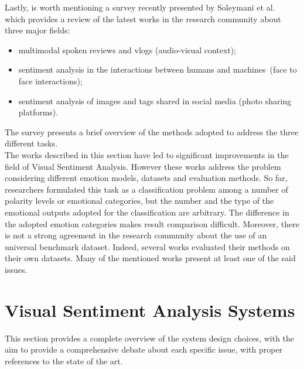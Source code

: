 Lastly, is worth mentioning a survey recently presented by Soleymani et al.~\cite{soleymani2017survey} which provides a review of the latest works in the research community about three major fields:
\begin{itemize}
	\item multimodal spoken reviews and vlogs (audio-visual context);
	\item sentiment analysis in the interactions between humans and machines~(face to face interactions);
	\item sentiment analysis of images and tags shared in social media (photo sharing platforms).
\end{itemize}
The survey presents a brief overview of the methods adopted to address the three different tasks.
\\

The works described in this section have led to significant improvements in the field of Visual Sentiment Analysis.
However these works address the problem considering different emotion models, datasets and evaluation methods.
So far, researchers formulated this task as a classification problem among a number of polarity levels or emotional categories, but the number and the type of the emotional outputs adopted for the classification are arbitrary. The difference in the adopted emotion categories makes result comparison difficult.
Moreover, there is not a strong agreement in the research community about the use of an universal benchmark dataset. Indeed, several works evaluated their methods on their own datasets.
Many of the mentioned works present at least one of the said issues.

\section{Visual Sentiment Analysis Systems}\label{systems}

This section provides a complete overview of the system design choices, with the aim to provide a comprehensive debate about each specific issue, with proper references to the state of the art.


